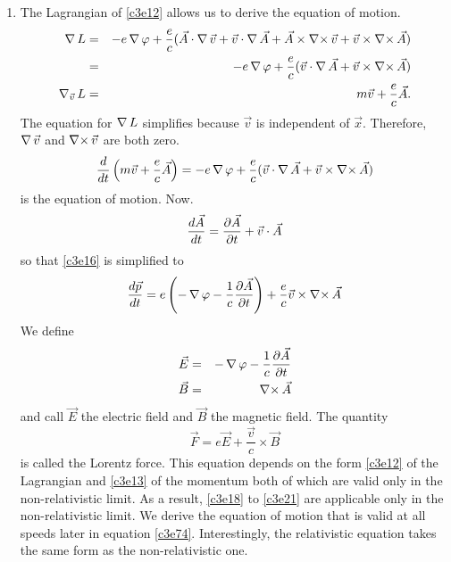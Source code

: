 \begin{enumerate}
\item The Lagrangian of \eqref{c3e12} allows us to derive the equation of motion.
\begin{eqnarray*}
\operatorname{\nabla} L &=& -e\operatorname{\nabla}\varphi + \frac{e}{c}(\vec{A}\cdot\operatorname{\nabla}\vec{v} + 
 \vec{v}\cdot\operatorname{\nabla}\vec{A} + \vec{A}\times\operatorname{\nabla\times}\vec{v} + \vec{v}\times\operatorname{\nabla\times}\vec{A})\\ 
 &=& -e\operatorname{\nabla}\varphi + \frac{e}{c}(\vec{v}\cdot\operatorname{\nabla}\vec{A} + \vec{v}\times\operatorname{\nabla\times}\vec{A})\\ 
\operatorname{\nabla}_{\vec{v}}L &=& m\vec{v} + \frac{e}{c}\vec{A}.
\end{eqnarray*}
The equation for $\operatorname{\nabla} L$ simplifies because $\vec{v}$ is independent of $\vec{x}$.
Therefore, $\operatorname{\nabla}\vec{v}$ and $\operatorname{\nabla\times}\vec{v}$ are both zero.
\begin{equation}\label{c3e16}
\frac{d}{dt}\left(m\vec{v} + \frac{e}{c}\vec{A}\right) = 
-e\operatorname{\nabla}\varphi + \frac{e}{c}(\vec{v}\cdot\operatorname{\nabla}\vec{A} + \vec{v}\times\operatorname{\nabla\times}\vec{A})
\end{equation}
is the equation of motion. Now.
\begin{equation}\label{c3e17}
\frac{d{\vec{A}}}{d{t}} = \frac{\partial{\vec{A}}}{\partial{t}} + \vec{v}\cdot\vec{A}
\end{equation}
so that \eqref{c3e16} is simplified to
\begin{equation}\label{c3e18}
\frac{d{\vec{p}}}{d{t}} = e\left(-\operatorname{\nabla}\varphi - \frac{1}{c}\frac{\partial{\vec{A}}}{\partial{t}}\right)
+ \frac{e}{c}\vec{v}\times\operatorname{\nabla\times}\vec{A}
\end{equation}
We define
\begin{eqnarray}
\vec{E} &=& -\operatorname{\nabla}\varphi - \frac{1}{c}\frac{\partial{\vec{A}}}{\partial{t}} \label{c3e19} \\
\vec{B} &=& \operatorname{\nabla\times}\vec{A} \label{c3e20}
\end{eqnarray}
and call $\vec{E}$ the electric field and $\vec{B}$ the magnetic field. The
quantity
\begin{equation}\label{c3e21}
\vec{F} = e\vec{E} + \frac{\vec{v}}{c}\times\vec{B}
\end{equation}
is called the Lorentz force. This equation depends on the form \eqref{c3e12} of
the Lagrangian and \eqref{c3e13} of the momentum both of which are valid only in
the non-relativistic limit. As a result, \eqref{c3e18} to \eqref{c3e21} are 
applicable only in the non-relativistic limit. We derive the equation of motion
that is valid at all speeds later in equation \eqref{c3e74}. Interestingly, the
relativistic equation takes the same form as the non-relativistic one.


\end{enumerate}
